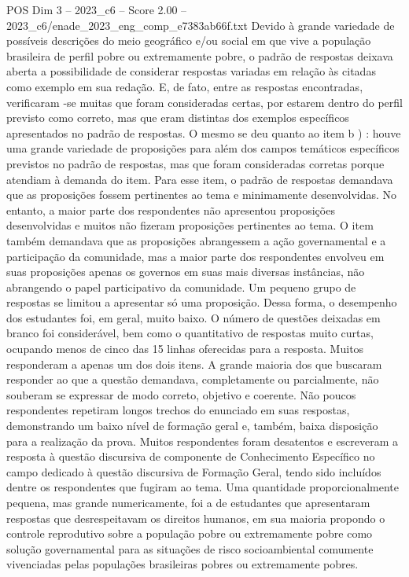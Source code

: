 \begin{textsample}{POS Dim 3 – 2023\_c6 – Score 2.00 – 2023\_c6/enade\_2023\_eng\_comp\_e7383ab66f.txt}
Devido à grande variedade de possíveis descrições do meio geográfico e/ou social em que vive a população brasileira de perfil pobre ou extremamente pobre, o padrão de respostas deixava aberta a possibilidade de considerar respostas variadas em relação às citadas como exemplo em sua redação.
E, de fato, entre as respostas encontradas, verificaram -se muitas que foram consideradas certas, por estarem dentro do perfil previsto como correto, mas que eram distintas dos exemplos específicos apresentados no padrão de respostas.
O mesmo se deu quanto ao item b ) : houve uma grande variedade de proposições para além dos campos temáticos específicos previstos no padrão de respostas, mas que foram consideradas corretas porque atendiam à demanda do item.
Para esse item, o padrão de respostas demandava que as proposições fossem pertinentes ao tema e minimamente desenvolvidas.
No entanto, a maior parte dos respondentes não apresentou proposições desenvolvidas e muitos não fizeram proposições pertinentes ao tema.
O item também demandava que as proposições abrangessem a ação governamental e a participação da comunidade, mas a maior parte dos respondentes envolveu em suas proposições apenas os governos em suas mais diversas instâncias, não abrangendo o papel participativo da comunidade.
Um pequeno grupo de respostas se limitou a apresentar só uma proposição.
Dessa forma, o desempenho dos estudantes foi, em geral, muito baixo.
O número de questões deixadas em branco foi considerável, bem como o quantitativo de respostas muito curtas, ocupando menos de cinco das 15 linhas oferecidas para a resposta.
Muitos responderam a apenas um dos dois itens.
A grande maioria dos que buscaram responder ao que a questão demandava, completamente ou parcialmente, não souberam se expressar de modo correto, objetivo e coerente.
Não poucos respondentes repetiram longos trechos do enunciado em suas respostas, demonstrando um baixo nível de formação geral e, também, baixa disposição para a realização da prova.
Muitos respondentes foram desatentos e escreveram a resposta à questão discursiva de componente de Conhecimento Específico no campo dedicado à questão discursiva de Formação Geral, tendo sido incluídos dentre os respondentes que fugiram ao tema.
Uma quantidade proporcionalmente pequena, mas grande numericamente, foi a de estudantes que apresentaram respostas que desrespeitavam os direitos humanos, em sua maioria propondo o controle reprodutivo sobre a população pobre ou extremamente pobre como solução governamental para as situações de risco socioambiental comumente vivenciadas pelas populações brasileiras pobres ou extremamente pobres.

\end{textsample}
